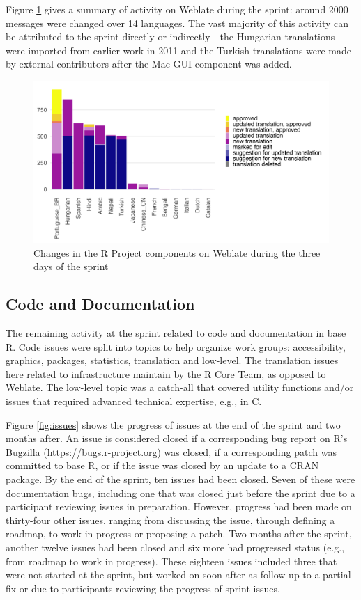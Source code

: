 Figure \ref{fig:translation} gives a summary of activity on Weblate during
the sprint: around 2000 messages were changed over 14 languages. The
vast majority of this activity can be attributed to the sprint
directly or indirectly - the Hungarian translations were imported from earlier
work in 2011 and the Turkish translations were made by external contributors
after the Mac GUI component was added.

\begin{figure}
\includegraphics[width=1\linewidth]{figures/translations} \caption{Changes in the R Project components on Weblate during the three days of the sprint}\label{fig:translation}
\end{figure}

\hypertarget{code-and-documentation}{%
\subsection{Code and Documentation}\label{code-and-documentation}}

The remaining activity at the sprint related to code and documentation in base R.
Code issues were split into topics to help organize work groups:
accessibility, graphics, packages, statistics, translation and low-level. The
translation issues here related to infrastructure maintain by the R Core Team, as opposed to Weblate. The low-level topic was a catch-all that covered utility
functions and/or issues that required advanced technical expertise, e.g., in C.

Figure \ref{fig:issues} shows the progress of issues at the end of the sprint
and two months after. An issue is considered closed if a corresponding bug report on R's Bugzilla (\url{https://bugs.r-project.org}) was closed, if a corresponding patch was committed to base R, or if the issue was closed by an update to a CRAN package. By the end of the sprint, ten issues had been closed. Seven of these were documentation bugs, including one that was closed just before the sprint due to a participant reviewing issues in preparation. However, progress had been made on thirty-four other issues, ranging from discussing the issue, through defining a roadmap, to work in progress or proposing a patch. Two months after the sprint, another twelve issues had been closed and six more had progressed status (e.g., from roadmap to work in progress). These eighteen issues included three that were not started at the sprint, but worked on soon after as follow-up to a partial fix or due to participants reviewing the progress of sprint issues.

